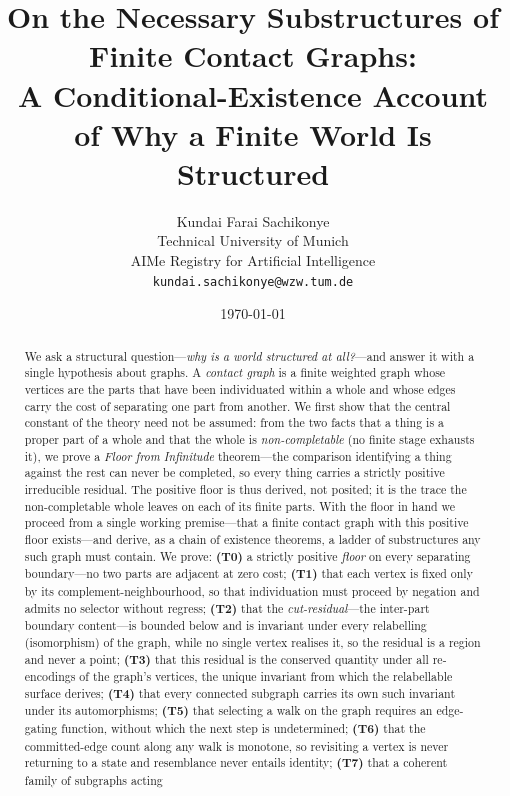 \documentclass[11pt,a4paper]{article}
\title{\textbf{On the Necessary Substructures of Finite Contact Graphs:\\[2pt]
A Conditional-Existence Account of Why a Finite World Is Structured}}
\author{%
Kundai Farai Sachikonye\\
\small Technical University of Munich\\
\small AIMe Registry for Artificial Intelligence\\
\small \texttt{kundai.sachikonye@wzw.tum.de}}
\date{\today}
\theoremstyle{thmstyle}
\theoremstyle{definition}
\theoremstyle{remark}
\begin{document}
\maketitle

\begin{abstract}
\noindent
We ask a structural question---\emph{why is a world structured at all?}---and
answer it with a single hypothesis about graphs. A \emph{contact graph} is a
finite weighted graph whose vertices are the parts that have been individuated
within a whole and whose edges carry the cost of separating one part from
another. We first show that the central constant of the theory need not be
assumed: from the two facts that a thing is a proper part of a whole and that the
whole is \emph{non-completable} \textup{(}no finite stage exhausts it\textup{)},
we prove a \emph{Floor from Infinitude} theorem---the comparison identifying a
thing against the rest can never be completed, so every thing carries a strictly
positive irreducible residual. The positive floor is thus derived, not posited;
it is the trace the non-completable whole leaves on each of its finite parts. With
the floor in hand we proceed from a single working premise---that a finite contact
graph with this positive floor exists---and derive, as a chain of existence
theorems, a ladder of substructures any such graph must contain. We prove:
\textbf{(T0)} a strictly positive \emph{floor} on every separating boundary---no
two parts are adjacent at zero cost; \textbf{(T1)} that each vertex is fixed only
by its complement-neighbourhood, so that individuation must proceed by negation
and admits no selector without regress; \textbf{(T2)} that the
\emph{cut-residual}---the inter-part boundary content---is bounded below and is
invariant under every relabelling (isomorphism) of the graph, while no single
vertex realises it, so the residual is a region and never a point; \textbf{(T3)}
that this residual is the conserved quantity under all re-encodings of the
graph's vertices, the unique invariant from which the relabellable surface
derives; \textbf{(T4)} that every connected subgraph carries its own such
invariant under its automorphisms; \textbf{(T5)} that selecting a walk on the
graph requires an edge-gating function, without which the next step is
undetermined; \textbf{(T6)} that the committed-edge count along any walk is
monotone, so revisiting a vertex is never returning to a state and resemblance
never entails identity; \textbf{(T7)} that a coherent family of subgraphs acting

\end{abstract}
\end{document}
